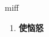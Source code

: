 
\begin{frame}
{\huge miff}
\begin{center}
\begin{enumerate}\Large
  \item \textbf{使恼怒}
\end{enumerate}
\end{center}
\end{frame}
